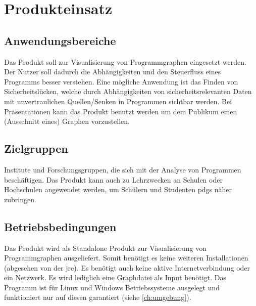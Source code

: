 \chapter{Produkteinsatz}\label{ch:einsatz}

\section{Anwendungsbereiche}
Das Produkt soll zur Visualisierung von Programmgraphen eingesetzt werden.
Der Nutzer soll dadurch die Abhängigkeiten und den Steuerfluss eines Programms besser verstehen.
Eine mögliche Anwendung ist das Finden von Sicherheitslücken, welche durch Abhängigkeiten von sicherheitsrelevanten Daten mit unvertraulichen Quellen/Senken in Programmen sichtbar werden.
Bei Präsentationen kann das Produkt benutzt werden um dem Publikum einen (Ausschnitt eines) Graphen vorzustellen.

\section{Zielgruppen}
Institute und Forschungsgruppen, die sich mit der Analyse von Programmen beschäftigen.
Das Produkt kann auch zu Lehrzwecken an Schulen oder Hochschulen angewendet werden, um Schülern und Studenten \glspl{pdg} näher zubringen.

\section{Betriebsbedingungen}
Das Produkt wird als Standalone Produkt zur Visualisierung von Programmgraphen ausgeliefert.
Somit benötigt es keine weiteren Installationen (abgesehen von der \gls{jre}).
Es benötigt auch keine aktive Internetverbindung oder ein Netzwerk.
Es wird lediglich eine Graphdatei als Input benötigt.
Das Programm ist für Linux und Windows Betriebssysteme ausgelegt und funktioniert nur auf diesen garantiert (siehe \autoref{ch:umgebung}).

